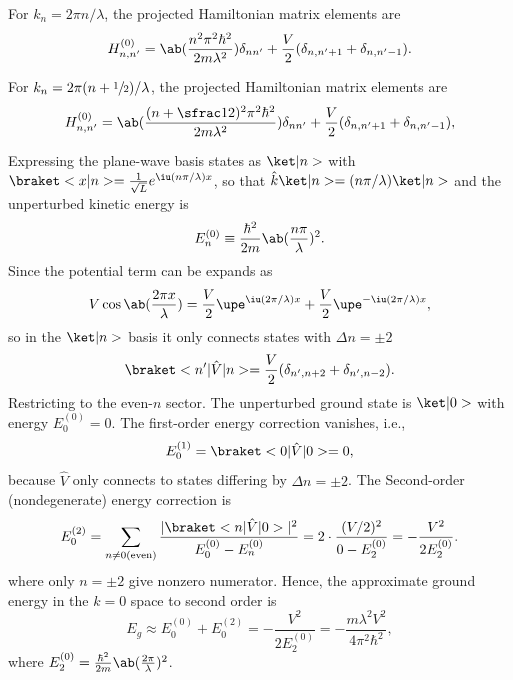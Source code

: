 \begin{solution}
\begin{enumext}
\begin{enumext}
      \item For $k_n = 2\pi n/\lambda$, the projected Hamiltonian matrix
      elements are
      \[
        H_{n,n'}^{(0)} = \ab(\frac{n^2\pi^2\hbar^2}{2m\lambda^2}) \delta_{nn'}
      + \frac V2(\delta_{n,n'+1} + \delta_{n,n'-1}).
      \]
      \item For $k_n = 2\pi(n + \sfrac12)/\lambda$, the projected Hamiltonian
      matrix elements are
      \[
        H_{n,n'}^{(0)} = \ab(\frac{(n + \sfrac12)^2\pi^2\hbar^2}{2m\lambda^2})
        \delta_{nn'} + \frac V2(\delta_{n,n'+1} + \delta_{n,n'-1}),
      \]
    \end{enumext}
    \item Expressing the plane-wave basis states as $\ket|n>$
    with $\braket<x|n> = \frac{1}{\sqrt L} e^{\iu(n\pi/\lambda) x}$,
    so that $\hat k \ket|n> = (n\pi/\lambda)\ket|n>$ and the unperturbed
    kinetic energy is
    \[
      E_n^{(0)} \equiv \frac{\hbar^2}{2m}\ab(\frac{n\pi}{\lambda})^2.
    \]
    Since the potential term can be expands as
    \[
      V \cos \ab(\frac{2\pi x}{\lambda})
    = \frac V2 \upe^{\iu(2\pi/\lambda)x} + \frac V2 \upe^{-\iu(2\pi/\lambda)x},
    \]
    so in the $\ket|n>$ basis it only connects states with $\Delta n = \pm 2$
    \[
      \braket<n'|\hat V|n> = \frac V2(\delta_{n',n+2}+\delta_{n',n-2}).
    \]
    Restricting to the even-$n$ sector. The unperturbed ground state
    is $\ket|0>$ with energy $E_0^{(0)}=0$.
    The first-order energy correction vanishes, i.e.,
    \[
      E_0^{(1)} = \braket<0|\hat V|0> = 0,
    \]
    because $\hat V$ only connects to states differing by $\Delta n = \pm2$.
    The Second-order (nondegenerate) energy correction is
    \[
      E_0^{(2)} = \sum_{n\neq 0 (\text{even})}
      \frac{|\braket<n|\hat V|0>|^2}{E_0^{(0)} - E_n^{(0)}}
    = 2\cdot\frac{(V/2)^2}{0 - E_2^{(0)}}
    = -\frac{V^2}{2E_2^{(0)}}.
    \]
    where only $n = \pm 2$ give nonzero numerator.
    Hence, the approximate ground energy in the $k = 0$ space to second order is
    \[
      E_g \approx E_0^{(0)} + E_0^{(2)}
    = -\frac{V^2}{2E_2^{(0)}} = -\frac{m\lambda^2 V^2}{4\pi^2 \hbar^2},
    \]
    where $E_2^{(0)} = \frac{\hbar^2}{2m}\ab(\frac{2\pi}{\lambda})^2$.


\end{enumext}
\end{solution}

